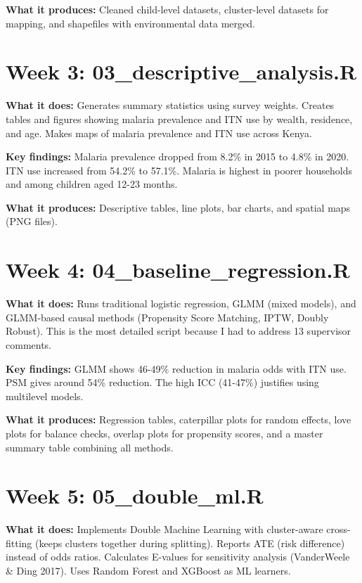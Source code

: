 \documentclass[11pt]{article}
\begin{document}
	\textbf{What it produces:} Cleaned child-level datasets, cluster-level datasets for mapping, and shapefiles with environmental data merged.
	
	\section*{Week 3: 03\_descriptive\_analysis.R}
	
	\textbf{What it does:} Generates summary statistics using survey weights. Creates tables and figures showing malaria prevalence and ITN use by wealth, residence, and age. Makes maps of malaria prevalence and ITN use across Kenya.
	
	\textbf{Key findings:} Malaria prevalence dropped from 8.2\% in 2015 to 4.8\% in 2020. ITN use increased from 54.2\% to 57.1\%. Malaria is highest in poorer households and among children aged 12-23 months.
	
	\textbf{What it produces:} Descriptive tables, line plots, bar charts, and spatial maps (PNG files).
	
	\section*{Week 4: 04\_baseline\_regression.R}
	
	\textbf{What it does:} Runs traditional logistic regression, GLMM (mixed models), and GLMM-based causal methods (Propensity Score Matching, IPTW, Doubly Robust). This is the most detailed script because I had to address 13 supervisor comments.
	
	\textbf{Key findings:} GLMM shows 46-49\% reduction in malaria odds with ITN use. PSM gives around 54\% reduction. The high ICC (41-47\%) justifies using multilevel models.
	
	\textbf{What it produces:} Regression tables, caterpillar plots for random effects, love plots for balance checks, overlap plots for propensity scores, and a master summary table combining all methods.
	
	\section*{Week 5: 05\_double\_ml.R}
	
	\textbf{What it does:} Implements Double Machine Learning with cluster-aware cross-fitting (keeps clusters together during splitting). Reports ATE (risk difference) instead of odds ratios. Calculates E-values for sensitivity analysis (VanderWeele \& Ding 2017). Uses Random Forest and XGBoost as ML learners.
	
\end{document}
